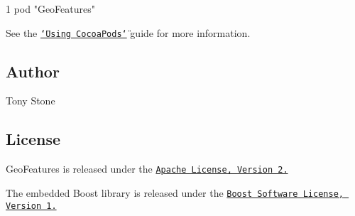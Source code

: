 \begin{DoxyCode}
1 pod "GeoFeatures"
\end{DoxyCode}


See the \href{https://guides.cocoapods.org/using/using-cocoapods.html}{\tt \char`\"{}\+Using Cocoa\+Pods\char`\"{}} guide for more information.

\subsection*{Author}

Tony Stone

\subsection*{License}

Geo\+Features is released under the \href{http://www.apache.org/licenses/LICENSE-2.0.html}{\tt Apache License, Version 2.}

The embedded Boost library is released under the \href{http://www.boost.org/users/license.html}{\tt Boost Software License, Version 1.} 